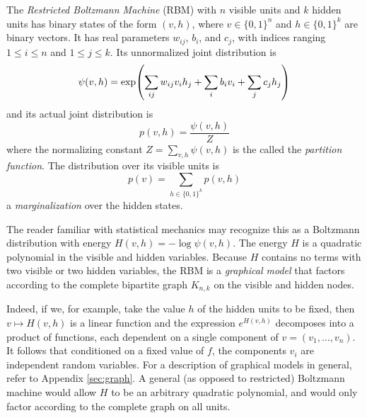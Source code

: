\documentclass[11pt,titlepage]{article}
\numberwithin{equation}{section}
\begin{document}
    \begin{definition}
    The \emph{Restricted Boltzmann Machine} (RBM) with $n$ visible units and $k$
    hidden units has binary states of the form $(v, h)$, where $v \in \{0,1\}^n$
    and $h \in \{0,1\}^k$ are binary vectors.  It has real parameters $w_{ij}$,
    $b_i$, and $c_j$, with indices ranging $1 \le i \le n$ and $1 \le j \le k$.
    Its unnormalized joint distribution is
    \begin{equation}\label{eq:rbm-unnorm}
        \psi(v, h) = \exp\pdil*{
            \sum_{ij} w_{ij} v_i h_j + \sum_i b_i v_i + \sum_j c_j h_j
        }
    \end{equation}
    and its actual joint distribution is 
    \[
        p(v, h) = \frac{\psi(v,h)}{Z}
    \] 
    where the normalizing constant $Z = \sum_{v,h} \psi(v, h)$ is the called the
    \emph{partition function}.  The distribution over its visible units is
    \[
        p(v) = \sum_{h \in \{0,1\}^k} p(v,h)
    \]
    a \emph{marginalization} over the hidden states.
    \end{definition}
    The reader familiar with statistical mechanics may recognize this as a
    Boltzmann distribution with energy $H(v,h) = - \log \psi(v, h)$.  The energy
    $H$ is a quadratic polynomial in the visible and hidden variables.  Because
    $H$ contains no terms with two visible or two hidden variables, the RBM is a
    \emph{graphical model} that factors according to the complete bipartite
    graph $K_{n,k}$ on the visible and hidden nodes.
    \begin{center}
    \end{center}
    Indeed, if we, for example, take the value $h$ of the hidden units to be
    fixed, then $v \mapsto H(v, h)$ is a linear function and the expression
    $e^{H(v,h)}$ decomposes into a product of functions, each dependent on a
    single component of $v = (v_1, \ldots, v_n)$.  It follows that conditioned
    on a fixed value of $f$, the components $v_i$ are independent random
    variables.  For a description of graphical models in general, refer to
    Appendix \ref{sec:graph}.  A general (as opposed to restricted) Boltzmann
    machine would allow $H$ to be an arbitrary quadratic polynomial, and would
    only factor according to the complete graph on all units.
\end{document}
